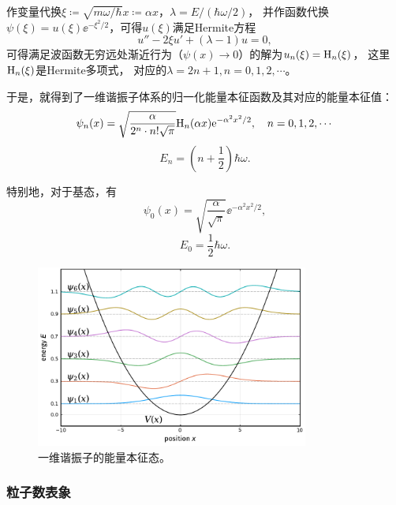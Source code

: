 作变量代换$\xi\coloneq \sqrt{m\omega/\hbar} x \coloneq \alpha x$，$\lambda = E/(\hbar\omega/2)$，
并作函数代换$\psi(\xi)=u(\xi)\ee^{-\xi^2/2}$，可得$u(\xi)$满足Hermite方程
\begin{equation}
    u''-2\xi u'+(\lambda-1)u = 0,
\end{equation}
可得满足波函数无穷远处渐近行为（$\psi(x)\rightarrow 0$）的解为$u_n(\xi) = \rm{H}_n(\xi)$，
这里$\rm{H}_n(\xi)$是Hermite多项式，
对应的$\lambda=2n+1, n=0,1,2,\cdots$。

\begin{tcolorbox}
于是，就得到了一维谐振子体系的归一化能量本征函数及其对应的能量本征值：
\begin{equation}
    \label{eq:onedim_osc_coord_wfn}
    \psi_n(x) = \sqrt{\frac{\alpha}{2^n\cdot n! \sqrt{\pi}}} \rm{H}_n(\alpha x) \ee^{-\alpha^2 x^2/2}, \quad n=0,1,2,\cdots
\end{equation}
\begin{equation}
    E_n = \left(n+\frac12\right) \hbar\omega.
\end{equation}

特别地，对于基态，有
\begin{equation}
    \psi_0(x) = \sqrt{\frac{\alpha}{\sqrt{\pi}}} \ee^{-\alpha^2 x^2/2},
\end{equation}
\begin{equation}
    E_0 = \frac12 \hbar\omega.
\end{equation}
\end{tcolorbox}

\begin{figure}[ht]
    \centering
    \includegraphics[width=0.8\textwidth]{figures/sec3_figures/harmonic_oscillator_eigenstates.pdf}
    \caption{一维谐振子的能量本征态。}
\end{figure}


\subsubsection{粒子数表象}

